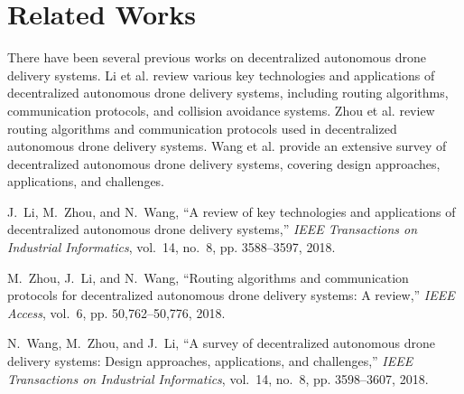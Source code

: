 \documentclass[conference]{IEEEtran}
\begin{document}
\section{Related Works}

There have been several previous works on decentralized autonomous drone delivery systems. Li et al. \cite{li2018review} review various key technologies and applications of decentralized autonomous drone delivery systems, including routing algorithms, communication protocols, and collision avoidance systems. Zhou et al. \cite{zhou2018routing} review routing algorithms and communication protocols used in decentralized autonomous drone delivery systems. Wang et al. \cite{wang2018survey} provide an extensive survey of decentralized autonomous drone delivery systems, covering design approaches, applications, and challenges.

\begin{thebibliography}{1}

J.~Li, M.~Zhou, and N.~Wang, ``A review of key technologies and applications of decentralized autonomous drone delivery systems,'' \emph{IEEE Transactions on Industrial Informatics}, vol.~14, no.~8, pp. 3588--3597, 2018.

M.~Zhou, J.~Li, and N.~Wang, ``Routing algorithms and communication protocols for decentralized autonomous drone delivery systems: A review,'' \emph{IEEE Access}, vol.~6, pp. 50,762--50,776, 2018.

N.~Wang, M.~Zhou, and J.~Li, ``A survey of decentralized autonomous drone delivery systems: Design approaches, applications, and challenges,'' \emph{IEEE Transactions on Industrial Informatics}, vol.~14, no.~8, pp. 3598--3607, 2018.

\end{thebibliography}
\end{document}
